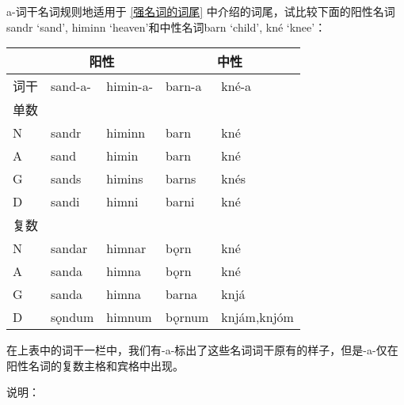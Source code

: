 a-词干名词规则地适用于 \ref{强名词的词尾} 中介绍的词尾，试比较下面的阳性名词sandr
`sand', himinn `heaven'和中性名词barn `child', kné `knee'：

\begin{longtable}{lllll}
  \toprule
       & \multicolumn{2}{c}{\textbf{阳性}} & \multicolumn{2}{c}{\textbf{中性}}                        \\
  \midrule
  \endhead
  \bottomrule
  \endfoot
  词干 & sand-a-                  & himin-a-                 & barn-a & kné-a       \\
  单数 &                          &                          &        &             \\
  N    & sandr                    & himinn                   & barn   & kné         \\
  A    & sand                     & himin                    & barn   & kné         \\
  G    & sands                    & himins                   & barns  & knés        \\
  D    & sandi                    & himni                    & barni  & kné         \\
  复数 &                          &                          &        &             \\
  N    & sandar                   & himnar                   & bǫrn   & kné         \\
  A    & sanda                    & himna                    & bǫrn   & kné         \\
  G    & sanda                    & himna                    & barna  & knjá        \\
  D    & sǫndum                   & himnum                   & bǫrnum & knjám,knjóm \\
\end{longtable}

在上表中的词干一栏中，我们有-a-标出了这些名词词干原有的样子，但是-a-仅在阳性名词的复数主格和宾格中出现。

说明：

